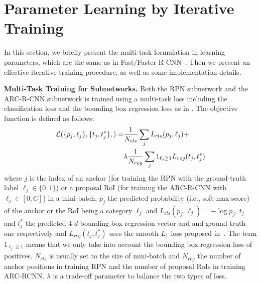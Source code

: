 \documentclass[10pt,twocolumn,letterpaper]{article}
\begin{document}
\vspace{-2mm}
\section{Parameter Learning by Iterative Training\label{sec:training}}
\vspace{-1mm}

In this section, we briefly present the multi-task formulation in learning parameters, which are the same as in Fast/Faster R-CNN~\cite{fast_rcnn,faster_rcnn}.  Then we present an effective iterative training procedure, as well as some implementation details.

\textbf{Multi-Task Training for Subnetworks.}
Both the RPN subnetwork and the ARC-R-CNN subnetwork is trained using a multi-task loss including the classification loss and the bounding box regression loss as in \cite{fast_rcnn,faster_rcnn}. The objective function is defined as follows:
\begin{align}
\nonumber \mathcal{L}(\{p_j, \ell_j\}, \{t_j, t_j^*\},) = &{1\over N_{cls}}\sum_j L_{cls}(p_j, \ell_j) + \\
& \lambda {1\over N_{reg}}\sum_j 1_{\ell_j\geq 1}L_{reg}(t_j, t_j^*)
\end{align}
where $j$ is the index of an anchor (for training the RPN with the ground-truth label $\ell_j\in\{0, 1\}$) or a proposal RoI (for training the ARC-R-CNN with $\ell_j\in [0, C]$) in a mini-batch, $p_j$ the predicted probability (i.e., soft-max score) of the anchor or the RoI being a category $\ell_j$ and $L_{cls}(p_j, \ell_j)=-\log p_j$, $t_j$ and $t_j^*$ the predicted  $4$-$d$ bounding box regression vector and and ground-truth one respectively and $L_{reg}(t_j, t_j^*)$ uses the smooth-$L_1$ loss proposed in~\cite{fast_rcnn}.  The term $1_{\ell_j\geq 1}$ means that we only take into account the bounding box regression loss of positives. $N_{cls}$ is usually set to the size of mini-batch and $N_{reg}$ the number of anchor positions in training RPN and the number of proposal RoIs in training ARC-RCNN. $\lambda$ is a trade-off parameter to balance the two types of loss.
\end{document}
